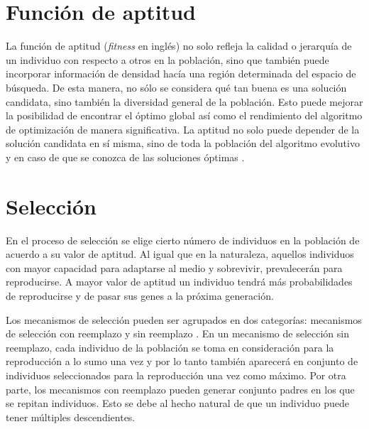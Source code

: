 \section{Función de aptitud}
La función de aptitud (\textit{fitness} en inglés) no solo refleja la calidad o jerarquía de un individuo con respecto a otros en la población, sino que también puede incorporar información de densidad hacía una región determinada del espacio de búsqueda. De esta manera, no sólo se considera qué tan buena es una solución candidata, sino también la diversidad general de la población. Esto puede mejorar la posibilidad de encontrar el óptimo global así como el rendimiento del algoritmo de optimización de manera significativa. La aptitud no solo puede depender de la solución candidata en sí misma, sino de toda la población del algoritmo evolutivo y en caso de que se conozca de las soluciones óptimas \cite{weise2009global}.
\section{Selección}\label{Seleccion}
En el proceso  de selección se elige cierto número de individuos en la población de acuerdo a su valor de aptitud. Al igual que en la naturaleza, aquellos individuos con mayor capacidad para adaptarse al medio y sobrevivir, prevalecerán para reproducirse. A mayor valor de aptitud un individuo tendrá más probabilidades de reproducirse y de pasar sus genes a la próxima generación.
 
Los mecanismos de selección pueden ser agrupados en dos categorías: mecanismos de selección con reemplazo y sin reemplazo \cite{weise2009global}. En un mecanismo de selección sin reemplazo, cada individuo de la población se toma en consideración para la reproducción a lo sumo una vez y por lo tanto también aparecerá en conjunto de individuos seleccionados para la reproducción una vez como máximo. Por otra parte, los mecanismos con  reemplazo pueden generar conjunto padres en los que se repitan individuos. Esto se debe al hecho natural de que un individuo puede tener múltiples descendientes.

